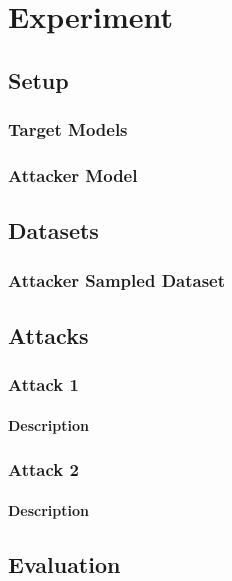 
\chapter{Experiment}
	
	\section{Setup}
	
		\subsection{Target Models}
		
		\subsection{Attacker Model}
		
	\section{Datasets}
	
		\subsection{Attacker Sampled Dataset}
		
	\section{Attacks}
	
		\subsection{Attack 1}
		
			\subsubsection{Description}

		\subsection{Attack 2}
		
			\subsubsection{Description}
	
	\section{Evaluation}
		
